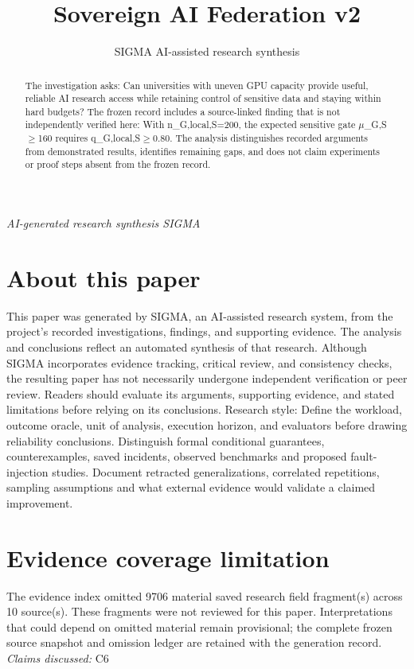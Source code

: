 \documentclass[11pt]{article}
\title{Sovereign AI Federation v2}
\date{}
\author{SIGMA AI-assisted research synthesis}
\begin{document}
\maketitle
\begin{center}\end{center}
\begin{center}\small\textit{AI-generated research synthesis \textperiodcentered{} SIGMA}\end{center}

\begin{abstract}
The investigation asks: Can universities with uneven GPU capacity provide useful, reliable AI research access while retaining control of sensitive data and staying within hard budgets? The frozen record includes a source-linked finding that is not independently verified here: With n\_G,local,S=200, the expected sensitive gate $\mu$\_G,S$\geq$160 requires q\_G,local,S$\geq$0.80. The analysis distinguishes recorded arguments from demonstrated results, identifies remaining gaps, and does not claim experiments or proof steps absent from the frozen record.
\end{abstract}
\section*{About this paper}
This paper was generated by SIGMA, an AI-assisted research system, from the project's recorded investigations, findings, and supporting evidence.
The analysis and conclusions reflect an automated synthesis of that research. Although SIGMA incorporates evidence tracking, critical review, and consistency checks, the resulting paper has not necessarily undergone independent verification or peer review.
Readers should evaluate its arguments, supporting evidence, and stated limitations before relying on its conclusions.
Research style: Define the workload, outcome oracle, unit of analysis, execution horizon, and evaluators before drawing reliability conclusions. Distinguish formal conditional guarantees, counterexamples, saved incidents, observed benchmarks and proposed fault-injection studies. Document retracted generalizations, correlated repetitions, sampling assumptions and what external evidence would validate a claimed improvement.
\section*{Evidence coverage limitation}
The evidence index omitted 9706 material saved research field fragment(s) across 10 source(s). These fragments were not reviewed for this paper. Interpretations that could depend on omitted material remain provisional; the complete frozen source snapshot and omission ledger are retained with the generation record.
\textit{Claims discussed: }C6
\end{document}
